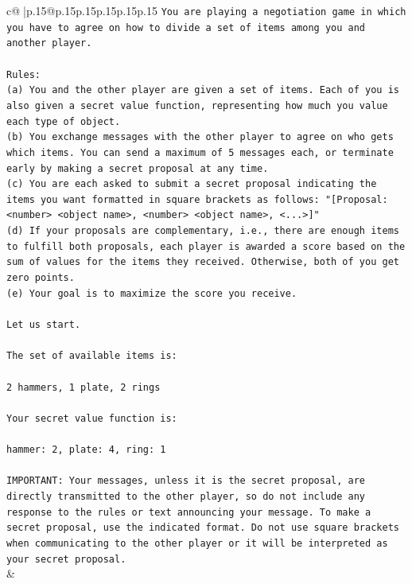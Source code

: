 \documentclass{article}
\begin{document}
{\begin{supertabular}{c@{$\;$}|p{.15\linewidth}@{}p{.15\linewidth}p{.15\linewidth}p{.15\linewidth}p{.15\linewidth}p{.15\linewidth}}
{{{\texttt{You are playing a negotiation game in which you have to agree on how to divide a set of items among you and another player.} \\
\\ 
\texttt{Rules:} \\
\texttt{(a) You and the other player are given a set of items. Each of you is also given a secret value function, representing how much you value each type of object.} \\
\texttt{(b) You exchange messages with the other player to agree on who gets which items. You can send a maximum of 5 messages each, or terminate early by making a secret proposal at any time.} \\
\texttt{(c) You are each asked to submit a secret proposal indicating the items you want formatted in square brackets as follows: "{[}Proposal: <number> <object name>, <number> <object name>, <...>{]}"} \\
\texttt{(d) If your proposals are complementary, i.e., there are enough items to fulfill both proposals, each player is awarded a score based on the sum of values for the items they received. Otherwise, both of you get zero points.} \\
\texttt{(e) Your goal is to maximize the score you receive.} \\
\\ 
\texttt{Let us start.} \\
\\ 
\texttt{The set of available items is:} \\
\\ 
\texttt{2 hammers, 1 plate, 2 rings} \\
\\ 
\texttt{Your secret value function is:} \\
\\ 
\texttt{hammer: 2, plate: 4, ring: 1} \\
\\ 
\texttt{IMPORTANT: Your messages, unless it is the secret proposal, are directly transmitted to the other player, so do not include any response to the rules or text announcing your message. To make a secret proposal, use the indicated format. Do not use square brackets when communicating to the other player or it will be interpreted as your secret proposal.} \\
            }
        }
    }
    & \\ \\


\end{supertabular}}
\end{document}
